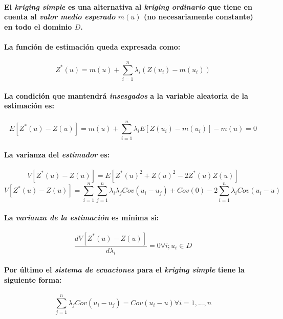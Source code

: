 \paragraph{
El \emph{kriging simple} es una alternativa al \emph{kriging ordinario} que tiene en cuenta al \emph{valor medio esperado} $m(u)$ (no necesariamente constante) en todo el dominio $D$.
}
\paragraph{
La función de estimación queda expresada como:
}
\begin{equation}
Z^*(u) = m(u) + \sum_{i=1}^n \lambda_i (Z(u_i) - m(u_i))
\end{equation}
\paragraph{
La condición que mantendrá \emph{insesgados} a la variable aleatoria de la estimación es:
}
\begin{equation}
E[Z^*(u)-Z(u)]=m(u)+\sum_{i=1}^n\lambda_i E[Z(u_i)-m(u_i)] - m(u) = 0
\end{equation}
\paragraph{
La varianza del \emph{estimador} es:
}
\begin{equation}
V[Z^*(u)-Z(u)] = E[Z^*(u)^2 + Z(u)^2 - 2 Z^*(u) Z(u)]
\end{equation}
\begin{equation}
V[Z^*(u)-Z(u)] = \sum_{i=1}^n \sum_{j=1}^n \lambda_i \lambda_j Cov(u_i - u_j) + Cov(0) - 2 \sum_{i=1}^n \lambda_i Cov(u_i - u)
\end{equation}
\paragraph{
La \emph{varianza de la estimación} es mínima si:
}
\begin{equation}
\frac{dV[Z^*(u)-Z(u)]}{d\lambda_i} = 0 \forall i; u_i \in D
\end{equation}
\paragraph{
Por último el \emph{sistema de ecuaciones} para el \emph{kriging simple} tiene la siguiente forma:
}
\begin{equation}
\sum_{j=1}^n \lambda_j Cov(u_i - u_j) = Cov(u_i - u) \forall i = 1,...,n
\end{equation}



